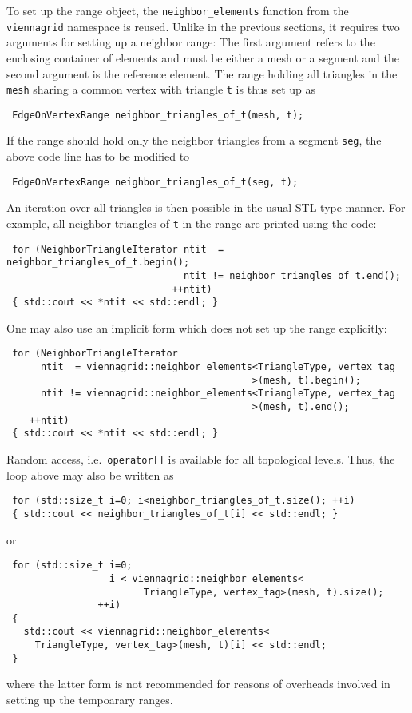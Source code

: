 To set up the range object, the \lstinline|neighbor_elements| function from the \lstinline|viennagrid| namespace is reused. Unlike in the previous sections, it requires two arguments
for setting up a neighbor range: The first argument refers to the enclosing container of elements and must be either a mesh or a segment and the second argument is the reference element.
The range holding all triangles in the \lstinline|mesh| sharing a common vertex with triangle \lstinline|t| is thus set up as
\begin{lstlisting}
 EdgeOnVertexRange neighbor_triangles_of_t(mesh, t);
\end{lstlisting}
If the range should hold only the neighbor triangles from a segment \lstinline|seg|, the above code line has to be modified to
\begin{lstlisting}
 EdgeOnVertexRange neighbor_triangles_of_t(seg, t);
\end{lstlisting}
An iteration over all triangles is then possible in the usual STL-type manner. For example, all neighbor triangles of \lstinline|t| in the range are printed using the code:
\begin{lstlisting}
 for (NeighborTriangleIterator ntit  = neighbor_triangles_of_t.begin();
                               ntit != neighbor_triangles_of_t.end();
                             ++ntit)
 { std::cout << *ntit << std::endl; }
\end{lstlisting}


One may also use an implicit form which does not set up the range explicitly:
\begin{lstlisting}
 for (NeighborTriangleIterator
      ntit  = viennagrid::neighbor_elements<TriangleType, vertex_tag
                                           >(mesh, t).begin();
      ntit != viennagrid::neighbor_elements<TriangleType, vertex_tag
                                           >(mesh, t).end();
    ++ntit)
 { std::cout << *ntit << std::endl; }
\end{lstlisting}

Random access, i.e.~\lstinline|operator[]| is available for all topological levels. Thus, the loop above may also be written as
\begin{lstlisting}
 for (std::size_t i=0; i<neighbor_triangles_of_t.size(); ++i)
 { std::cout << neighbor_triangles_of_t[i] << std::endl; }
\end{lstlisting}
or
\begin{lstlisting}
 for (std::size_t i=0;
                  i < viennagrid::neighbor_elements<
                        TriangleType, vertex_tag>(mesh, t).size();
                ++i)
 {
   std::cout << viennagrid::neighbor_elements<
     TriangleType, vertex_tag>(mesh, t)[i] << std::endl;
 }
\end{lstlisting}
where the latter form is not recommended for reasons of overheads involved in setting up the tempoarary ranges.
